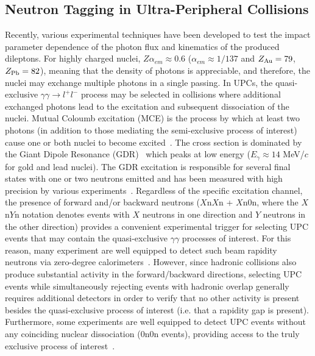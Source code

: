\documentclass[12pt,epjc3]{svjour3}\sloppy
\begin{document}
\subsection{Neutron Tagging in Ultra-Peripheral Collisions}
Recently, various experimental techniques have been developed to test the impact parameter dependence of the photon flux and kinematics of the produced dileptons. 
For highly charged nuclei, $Z\alpha_{em} \approx 0.6$ ($\alpha_{em} \approx 1/137$ and $Z_{\rm{Au}} = 79$, $Z_{\rm{Pb}} = 82$), meaning that the density of photons is appreciable, and therefore, the nuclei may exchange multiple photons in a single passing.
In UPCs, the quasi-exclusive $\gamma\gamma \rightarrow l^+l^-$ process may be selected in collisions where additional exchanged photons lead to the excitation and subsequent dissociation of the nuclei. 
Mutual Coloumb excitation (MCE) is the process by which at least two photons (in addition to those mediating the semi-exclusive process of interest) cause one or both nuclei to become excited~\cite{stelsonCoulombExcitation1963}. 
The cross section is dominated by the Giant Dipole Resonance (GDR)~\cite{newtonObservationGiantDipole1981} which peaks at low energy ($E_\gamma\approx 14$ MeV/$c$ for gold and lead nuclei). 
The GDR excitation is responsible for several final states with one or two neutrons emitted and has been measured with high precision by various experiments~\cite{veyssierePhotoneutronCrossSections1970}.
Regardless of the specific excitation channel, the presence of forward and/or backward neutrons ($X$n$X$n + $X$n$0$n, where the $X$n$Y$n notation denotes events with $X$ neutrons in one direction and $Y$ neutrons in the other direction) provides a convenient experimental trigger for selecting UPC events that may contain the quasi-exclusive $\gamma\gamma$ processes of interest. 
For this reason, many experiment are well equipped to detect such beam rapidity neutrons via zero-degree calorimeters~\cite{adlerRHICZeroDegree2001b,arnaldiNeutronZeroDegree2006,grachovStatusZeroDegree2006,whiteATLASZeroDegree2010,golubevaNuclearnuclearCollisionCentrality2013}.
However, since hadronic collisions also produce substantial activity in the forward/backward directions, selecting UPC events while simultaneously rejecting events with hadronic overlap generally requires additional detectors in order to verify that no other activity is present besides the quasi-exclusive process of interest (i.e. that a rapidity gap is present). Furthermore, some experiments are well equipped to detect UPC events without any coinciding nuclear dissociation ($0$n$0$n events), providing access to the truly exclusive process of interest~\cite{atlascollaborationExclusiveDimuonProduction2020,cmscollaborationObservationForwardNeutron2020a}.  
\end{document}
